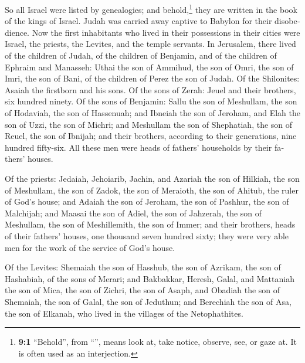 \begin{paracol}{2}
\begin{otherlanguage}{english}
 So all Israel were listed by genealogies; and
behold,\footnote{\textbf{9:1} ``Behold'', from ``'', means
  look at, take notice, observe, see, or gaze at. It is often used as an
  interjection.} they are written in the book of the kings of Israel.
Judah was carried away captive to Babylon for their disobedience.
 Now the first inhabitants who lived in their possessions
in their cities were Israel, the priests, the Levites, and the temple
servants.  In Jerusalem, there lived of the children of
Judah, of the children of Benjamin, and of the children of Ephraim and
Manasseh:  Uthai the son of Ammihud, the son of Omri, the
son of Imri, the son of Bani, of the children of Perez the son of Judah.
 Of the Shilonites: Asaiah the firstborn and his sons.
 Of the sons of Zerah: Jeuel and their brothers, six
hundred ninety.  Of the sons of Benjamin: Sallu the son of
Meshullam, the son of Hodaviah, the son of Hassenuah;  and
Ibneiah the son of Jeroham, and Elah the son of Uzzi, the son of Michri;
and Meshullam the son of Shephatiah, the son of Reuel, the son of
Ibnijah;  and their brothers, according to their
generations, nine hundred fifty-six. All these men were heads of
fathers' households by their fathers' houses.

 Of the priests: Jedaiah, Jehoiarib, Jachin,
 and Azariah the son of Hilkiah, the son of Meshullam,
the son of Zadok, the son of Meraioth, the son of Ahitub, the ruler of
God's house;  and Adaiah the son of Jeroham, the son of
Pashhur, the son of Malchijah; and Maasai the son of Adiel, the son of
Jahzerah, the son of Meshullam, the son of Meshillemith, the son of
Immer;  and their brothers, heads of their fathers'
houses, one thousand seven hundred sixty; they were very able men for
the work of the service of God's house.

 Of the Levites: Shemaiah the son of Hasshub, the son of
Azrikam, the son of Hashabiah, of the sons of Merari; 
and Bakbakkar, Heresh, Galal, and Mattaniah the son of Mica, the son of
Zichri, the son of Asaph,  and Obadiah the son of
Shemaiah, the son of Galal, the son of Jeduthun; and Berechiah the son
of Asa, the son of Elkanah, who lived in the villages of the
Netophathites.


\end{otherlanguage}
\end{paracol}

